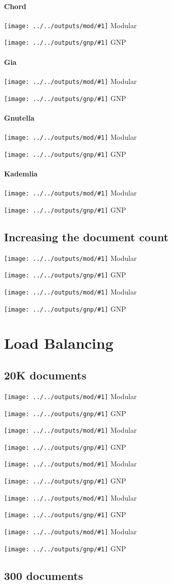 \documentclass[longdoc,nosectionpage,colorbacktitle,accentcolor=tud1b,11pt,paper=a4]{tudreport}
\newcommand{\imga}[2]{
  \texttt{[image: ../../outputs/mod/\#1]} Modular

  \texttt{[image: ../../outputs/gnp/\#1]} GNP

}
\begin{document}
	  \paragraph{Chord}
 
	  \imga{msgs_fs_chord}{.85}

	  \paragraph{Gia}

	  \imga{msgs_fs_gia}{.85}

	  \paragraph{Gnutella}

	  \imga{msgs_fs_gnutella}{.85}

	  \paragraph{Kademlia}

	  \imga{msgs_fs_kademlia}{.85}

	  \subsection{Increasing the document count}

	  \imga{scal_avgNHopsWithDocType}{.55}

	  \imga{scal_qSuccessWithDocType}{.55}

	\section{Load Balancing}

	  \subsection{20K documents}

	  \imga{loadBal_downBWConsPerHost_10000}{.85}

	  \imga{loadBal_downBWPerHost_10000}{.85}

	  \imga{loadBal_staleBWPerHost_10000}{.85}

	  \imga{loadBal_upBWConsPerHost_10000}{.85}

	  \imga{loadBal_upBWPerHost_10000}{.85}

	  \subsection{300 documents}
\end{document}
